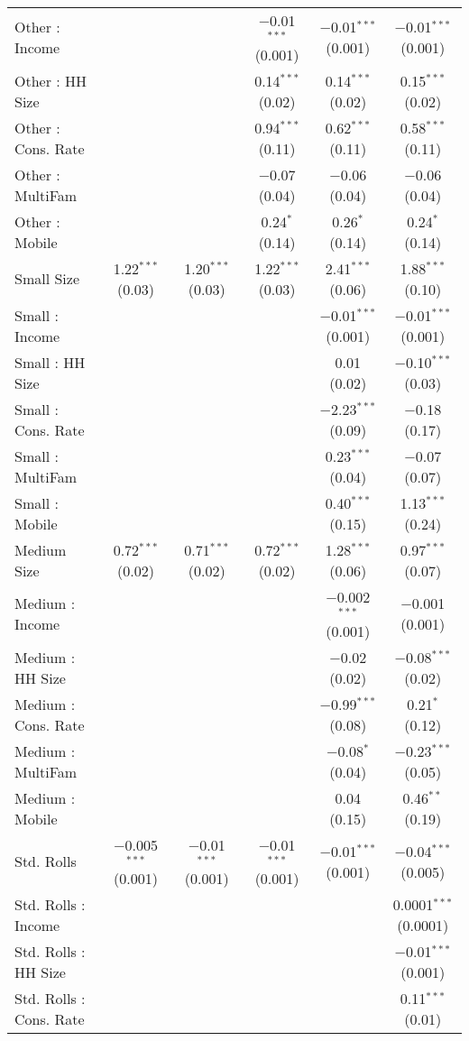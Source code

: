 \begin{table}[!htbp]
\begin{tabular}{@{\extracolsep{5pt}}lccccc}
  Other : Income &  &  & $-$0.01$^{***}$ (0.001) & $-$0.01$^{***}$ (0.001) & $-$0.01$^{***}$ (0.001) \\ 
  Other : HH Size &  &  & 0.14$^{***}$ (0.02) & 0.14$^{***}$ (0.02) & 0.15$^{***}$ (0.02) \\ 
  Other : Cons. Rate &  &  & 0.94$^{***}$ (0.11) & 0.62$^{***}$ (0.11) & 0.58$^{***}$ (0.11) \\ 
  Other : MultiFam &  &  & $-$0.07 (0.04) & $-$0.06 (0.04) & $-$0.06 (0.04) \\ 
  Other : Mobile &  &  & 0.24$^{*}$ (0.14) & 0.26$^{*}$ (0.14) & 0.24$^{*}$ (0.14) \\ 
  Small Size & 1.22$^{***}$ (0.03) & 1.20$^{***}$ (0.03) & 1.22$^{***}$ (0.03) & 2.41$^{***}$ (0.06) & 1.88$^{***}$ (0.10) \\ 
  Small : Income &  &  &  & $-$0.01$^{***}$ (0.001) & $-$0.01$^{***}$ (0.001) \\ 
  Small : HH Size &  &  &  & 0.01 (0.02) & $-$0.10$^{***}$ (0.03) \\ 
  Small : Cons. Rate &  &  &  & $-$2.23$^{***}$ (0.09) & $-$0.18 (0.17) \\ 
  Small : MultiFam &  &  &  & 0.23$^{***}$ (0.04) & $-$0.07 (0.07) \\ 
  Small : Mobile &  &  &  & 0.40$^{***}$ (0.15) & 1.13$^{***}$ (0.24) \\ 
  Medium Size & 0.72$^{***}$ (0.02) & 0.71$^{***}$ (0.02) & 0.72$^{***}$ (0.02) & 1.28$^{***}$ (0.06) & 0.97$^{***}$ (0.07) \\ 
  Medium : Income &  &  &  & $-$0.002$^{***}$ (0.001) & $-$0.001 (0.001) \\ 
  Medium : HH Size &  &  &  & $-$0.02 (0.02) & $-$0.08$^{***}$ (0.02) \\ 
  Medium : Cons. Rate &  &  &  & $-$0.99$^{***}$ (0.08) & 0.21$^{*}$ (0.12) \\ 
  Medium : MultiFam &  &  &  & $-$0.08$^{*}$ (0.04) & $-$0.23$^{***}$ (0.05) \\ 
  Medium : Mobile &  &  &  & 0.04 (0.15) & 0.46$^{**}$ (0.19) \\ 
  Std. Rolls & $-$0.005$^{***}$ (0.001) & $-$0.01$^{***}$ (0.001) & $-$0.01$^{***}$ (0.001) & $-$0.01$^{***}$ (0.001) & $-$0.04$^{***}$ (0.005) \\ 
  Std. Rolls : Income &  &  &  &  & 0.0001$^{***}$ (0.0001) \\ 
  Std. Rolls : HH Size &  &  &  &  & $-$0.01$^{***}$ (0.001) \\ 
  Std. Rolls : Cons. Rate &  &  &  &  & 0.11$^{***}$ (0.01) \\ 

\end{tabular}
\end{table}
